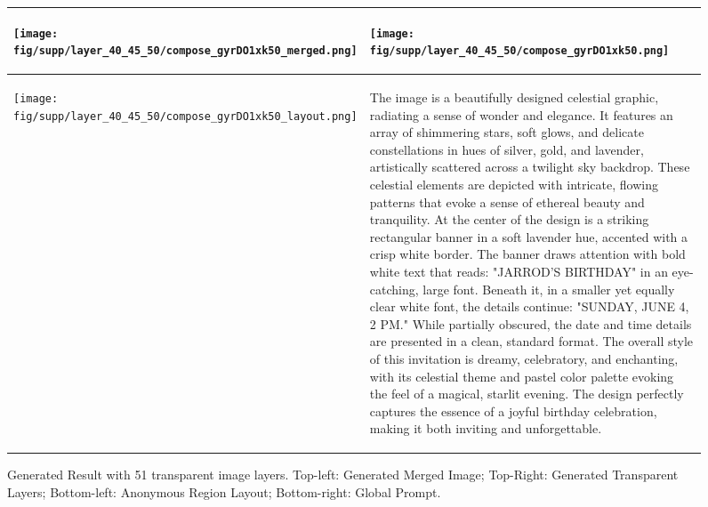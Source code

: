\begin{figure*}[h]
\begin{tabular}{|p{}|p{}|}
\hline
\begin{center}
\texttt{[image: fig/supp/layer\_40\_45\_50/compose\_gyrDO1xk50\_merged.png]}
\end{center}
& 
\begin{flushleft}

\texttt{[image: fig/supp/layer\_40\_45\_50/compose\_gyrDO1xk50.png]}
\end{flushleft} \\
\hline
\begin{center}
\texttt{[image: fig/supp/layer\_40\_45\_50/compose\_gyrDO1xk50\_layout.png]}
\end{center}
& 
\begin{flushleft}
{\small The image is a beautifully designed celestial graphic, radiating a sense of wonder and elegance. It features an array of shimmering stars, soft glows, and delicate constellations in hues of silver, gold, and lavender, artistically scattered across a twilight sky backdrop. These celestial elements are depicted with intricate, flowing patterns that evoke a sense of ethereal beauty and tranquility. At the center of the design is a striking rectangular banner in a soft lavender hue, accented with a crisp white border. The banner draws attention with bold white text that reads: "JARROD'S BIRTHDAY" in an eye-catching, large font. Beneath it, in a smaller yet equally clear white font, the details continue: "SUNDAY, JUNE 4, 2 PM." While partially obscured, the date and time details are presented in a clean, standard format. The overall style of this invitation is dreamy, celebratory, and enchanting, with its celestial theme and pastel color palette evoking the feel of a magical, starlit evening. The design perfectly captures the essence of a joyful birthday celebration, making it both inviting and unforgettable.}
\end{flushleft} \\
\hline
\end{tabular}
\caption{Generated Result with 51 transparent image layers. Top-left: Generated Merged Image; Top-Right: Generated Transparent Layers; Bottom-left: Anonymous Region Layout; Bottom-right: Global Prompt.}
\label{fig:more_layer_50}
\end{figure*}












